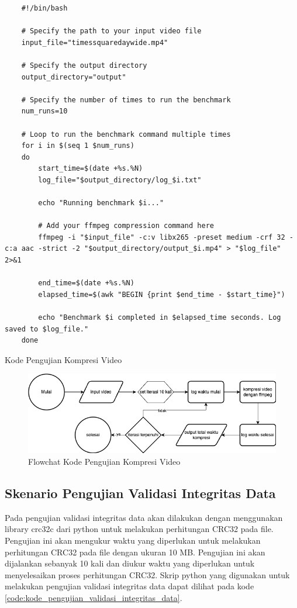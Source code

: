 \begin{listing}[H]
    \begin{verbatim}
    #!/bin/bash
    
    # Specify the path to your input video file
    input_file="timessquaredaywide.mp4"

    # Specify the output directory
    output_directory="output"

    # Specify the number of times to run the benchmark
    num_runs=10

    # Loop to run the benchmark command multiple times
    for i in $(seq 1 $num_runs)
    do
        start_time=$(date +%s.%N)
        log_file="$output_directory/log_$i.txt"
        
        echo "Running benchmark $i..."
        
        # Add your ffmpeg compression command here
        ffmpeg -i "$input_file" -c:v libx265 -preset medium -crf 32 -c:a aac -strict -2 "$output_directory/output_$i.mp4" > "$log_file" 2>&1
        
        end_time=$(date +%s.%N)
        elapsed_time=$(awk "BEGIN {print $end_time - $start_time}")
        
        echo "Benchmark $i completed in $elapsed_time seconds. Log saved to $log_file."
    done
    \end{verbatim}
    \caption{Kode Pengujian Kompresi Video}
    \label{code:kode_pengujian_kompresi_video}
\end{listing}

\begin{figure}
    \centering
    \includegraphics[width=1\textwidth]
    {assets/pics/code-flowchart/flowchart_kompresi_video.png}
    \caption{Flowchat Kode Pengujian Kompresi Video}
    \label{fig:flowchart_kompresi_video}
\end{figure}

\subsection{Skenario Pengujian Validasi Integritas Data}
Pada pengujian validasi integritas data akan dilakukan dengan menggunakan library crc32c dari python untuk melakukan perhitungan CRC32 pada file. Pengujian ini akan mengukur waktu yang diperlukan untuk melakukan perhitungan CRC32 pada file dengan ukuran 10 MB. Pengujian ini akan dijalankan sebanyak 10 kali dan diukur waktu yang diperlukan untuk menyelesaikan proses perhitungan CRC32. Skrip python yang digunakan untuk melakukan pengujian validasi integritas data dapat dilihat pada kode \ref{code:kode_pengujian_validasi_integritas_data}.

